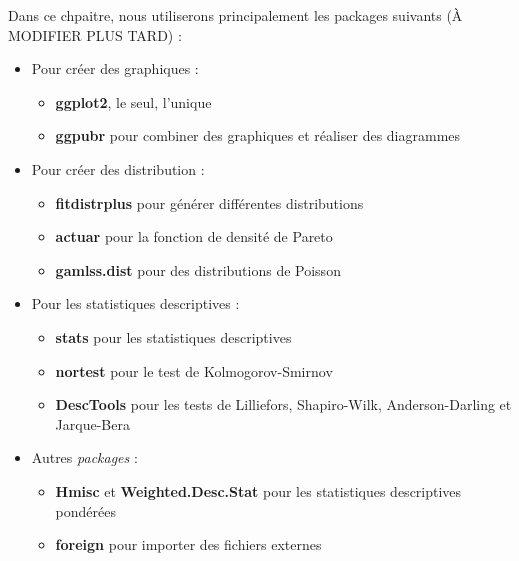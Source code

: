 \documentclass[
  11pt,
  french,
]{book}
\makeatletter
\providecommand{\tightlist}{%
  \setlength{\itemsep}{0pt}\setlength{\parskip}{0pt}}
\newenvironment{kframev}{%
\medskip{}
\setlength{\fboxsep}{.8em}
 \def\at@end@of@kframev{}%
 \ifinner\ifhmode%
  \def\at@end@of@kframev{\end{minipage}}%
  \begin{minipage}{\columnwidth}%
 \fi\fi%
 \def\FrameCommand##1{\hskip\@totalleftmargin \hskip-\fboxsep
 \colorbox{shadebluecolor}{##1}\hskip-\fboxsep
     \hskip-\linewidth \hskip-\@totalleftmargin \hskip\columnwidth}%
 \MakeFramed {\advance\hsize-\width
   \@totalleftmargin\z@ \linewidth\hsize
   \@setminipage}}%
 {\par\unskip\endMakeFramed%
 \at@end@of@kframev}
\newenvironment{rmdblock}[1]
  {
  \begin{itemize}
  \renewcommand{\labelitemi}{
    \raisebox{-.7\height}[0pt][0pt]{
      {\setkeys{Gin}{width=3em,keepaspectratio}\texttt{[image: images/\#1]}}
    }
  }
  \setlength{\fboxsep}{1em}
  \begin{kframev}
  \small
  \item
  }
  {
  \end{kframev}
  \end{itemize}
  }
\newenvironment{bloc_package}
  {\begin{rmdblock}{package}}
  {\end{rmdblock}}
\makeatother
\begin{document}
\begin{bloc_package}

Dans ce chpaitre, nous utiliserons principalement les packages suivants (À MODIFIER PLUS TARD) :

\begin{itemize}
\tightlist
\item
  Pour créer des graphiques :

  \begin{itemize}
  \tightlist
  \item
    \textbf{ggplot2}, le seul, l'unique
  \item
    \textbf{ggpubr} pour combiner des graphiques et réaliser des diagrammes
  \end{itemize}
\item
  Pour créer des distribution :

  \begin{itemize}
  \tightlist
  \item
    \textbf{fitdistrplus} pour générer différentes distributions
  \item
    \textbf{actuar} pour la fonction de densité de Pareto
  \item
    \textbf{gamlss.dist} pour des distributions de Poisson
  \end{itemize}
\item
  Pour les statistiques descriptives :

  \begin{itemize}
  \tightlist
  \item
    \textbf{stats} pour les statistiques descriptives
  \item
    \textbf{nortest} pour le test de Kolmogorov-Smirnov
  \item
    \textbf{DescTools} pour les tests de Lilliefors, Shapiro-Wilk, Anderson-Darling et Jarque-Bera
  \end{itemize}
\item
  Autres \emph{packages} :

  \begin{itemize}
  \tightlist
  \item
    \textbf{Hmisc} et \textbf{Weighted.Desc.Stat} pour les statistiques descriptives pondérées
  \item
    \textbf{foreign} pour importer des fichiers externes
  \end{itemize}
\end{itemize}


\end{bloc_package}
\end{document}

